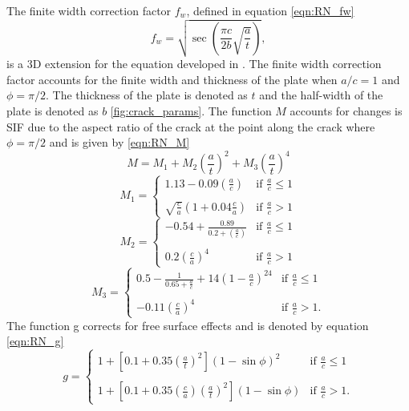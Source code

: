 The finite width correction factor $f_w$, defined in equation \ref{eqn:RN_fw}
\begin{equation} \label{eqn:RN_fw}
    f_w = \sqrt{\sec\left(\frac{\pi c}{2b}\sqrt{\frac{a}{t}}\right)},
\end{equation}
 is a 3D extension for the equation developed in \cite{brown1966}. The finite width correction factor accounts for the finite width and thickness of the plate when $a/c = 1$ and $\phi = \pi/2$. The thickness of the plate is denoted as $t$ and the half-width of the plate is denoted as $b$ \ref{fig:crack_params}. The function $M$ accounts for changes is SIF due to the aspect ratio of the crack at the point along the crack where $\phi = \pi/2$ and is given by \ref{eqn:RN_M}
\begin{equation} \label{eqn:RN_M}
    M = M_1 + M_2\left(\frac{a}{t}\right)^2 + M_3\left(\frac{a}{t}\right)^4
\end{equation}
\begin{equation} \label{eqn:RN_M1}
    M_1 = \begin{cases}
    1.13 - 0.09\left(\frac{a}{c}\right) & \text{if } \frac{a}{c} \le 1 \\
    \\
    \sqrt{\frac{c}{a}}\left(1 + 0.04\frac{c}{a}\right) & \text{if } \frac{a}{c} > 1
    \end{cases}
\end{equation}
\begin{equation} \label{eqn:RN_M2}
    M_2 = \begin{cases}
    -0.54 + \frac{0.89}{0.2+\left(\frac{a}{c}\right)} & \text{if } \frac{a}{c} \le 1 \\
    \\
    0.2\left(\frac{c}{a}\right)^4 & \text{if } \frac{a}{c} > 1
    \end{cases}
\end{equation}
\begin{equation} \label{eqn:RN_M3}
    M_3 = \begin{cases}
    0.5 - \frac{1}{0.65+\frac{a}{c}} + 14\left(1-\frac{a}{c}\right)^{24} & \text{if } \frac{a}{c} \le 1 \\
    \\
    -0.11\left(\frac{c}{a}\right)^4 & \text{if } \frac{a}{c} > 1.
    \end{cases}
\end{equation}
The function g corrects for free surface effects and is denoted by equation \ref{eqn:RN_g}
\begin{equation} \label{eqn:RN_g}
    g = \begin{cases}
    1 + \left[0.1 + 0.35\left(\frac{a}{t}\right)^2\right]\left(1 - \sin\phi\right)^2 & \text{if } \frac{a}{c} \le 1 \\
    \\
    1 + \left[0.1 + 0.35\left(\frac{c}{a}\right)\left(\frac{a}{t}\right)^2\right]\left(1 - \sin\phi\right) & \text{if } \frac{a}{c} > 1.
    \end{cases}
\end{equation}
